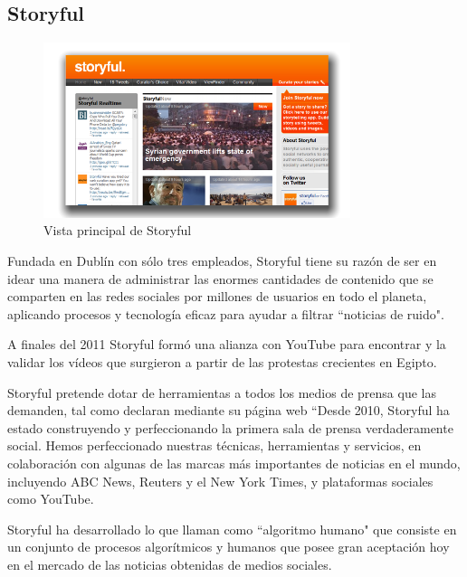 \subsection{Storyful}

\begin{figure}[h]
	\centering
	\includegraphics[width=0.8\textwidth]{imgs/storyful.png}
	\caption{Vista principal de Storyful}
	\label{fig:storyful}
\end{figure}

Fundada en Dublín con sólo tres empleados, Storyful \cite{storyful} tiene su razón de ser en idear una manera de administrar las enormes cantidades de contenido que se comparten en las redes sociales por millones de usuarios en todo el planeta, aplicando procesos y tecnología eficaz para ayudar a filtrar ``noticias de ruido". 


A finales del 2011 Storyful formó una alianza con YouTube para encontrar y la validar los vídeos que surgieron a partir de las protestas crecientes en Egipto.

Storyful pretende dotar de herramientas a todos los medios de prensa que las demanden, tal como declaran mediante su página web ``Desde 2010, Storyful ha estado construyendo y perfeccionando la primera sala de prensa verdaderamente social. Hemos perfeccionado nuestras técnicas, herramientas y servicios, en colaboración con algunas de las marcas más importantes de noticias en el mundo, incluyendo ABC News, Reuters y el New York Times, y plataformas sociales como YouTube.

Storyful ha desarrollado lo que llaman como ``algoritmo humano" que consiste en un conjunto de procesos algorítmicos y humanos que posee gran aceptación hoy en el mercado de las noticias obtenidas de medios sociales. 

